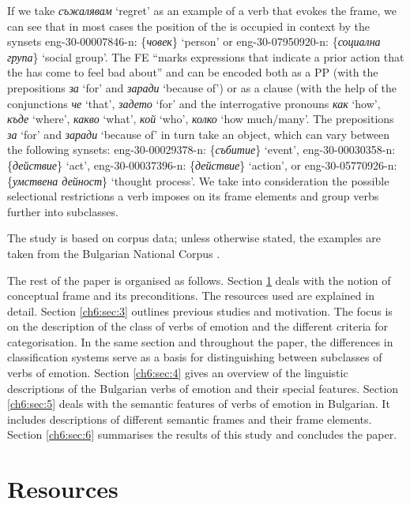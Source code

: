\documentclass[output=paper,colorlinks,citecolor=brown]{langscibook}
\begin{document}
If we take \textit{съжалявам} `regret' as an example of a verb that evokes the  frame, we can see that in most cases the position of the  is occupied in context  by the synsets eng-30-00007846-n: \{\textit{човек}\}  `person' or eng-30-07950920-n: \{\textit{социална група}\} `social group'. The  FE ``marks expressions that indicate a prior action that the  has come to feel bad about'' and can be encoded both as a PP (with the prepositions \textit{за} `for' and \textit{заради} `because of') or as a clause (with the help of the conjunctions \textit{че} `that', \textit{задето} `for' and the interrogative pronouns \textit{как} `how', \textit{къде} `where', \textit{какво} `what', \textit{кой} `who', \textit{колко} `how much/many'. The prepositions \textit{за} `for' and \textit{заради}  `because of' in turn take an object, which can vary between the following synsets: eng-30-00029378-n: \{\textit{събитие}\} `event', eng-30-00030358-n: \{\textit{действие}\} `act',  eng-30-00037396-n: \{\textit{действие}\} `action', or eng-30-05770926-n:  \{\textit{умствена дейност}\} `thought process'. We take into consideration the possible selectional restrictions a verb imposes on its frame elements and group verbs further into subclasses.
 

The study is based on corpus data; unless otherwise stated, the examples are taken from the Bulgarian National Corpus \citep{Koeva2012}.

The rest of the paper is organised as follows.
Section \ref{ch6:sec:2} deals with the notion of conceptual frame and its preconditions. The resources used are explained in detail. Section \ref{ch6:sec:3} outlines previous studies and motivation. The focus is on the description of the class of verbs of emotion and the different criteria for categorisation. In the same section and throughout the paper, the differences in classification systems serve as a basis for distinguishing between subclasses of verbs of emotion. Section \ref{ch6:sec:4} gives an overview of the linguistic descriptions of the Bulgarian verbs of emotion and their special features. Section \ref{ch6:sec:5} deals with the semantic features of verbs of emotion in Bulgarian. It includes descriptions of different semantic frames and their frame elements. Section \ref{ch6:sec:6} summarises the results of this study and concludes the paper.

 

\section{Resources} \label{ch6:sec:2}
\end{document}
